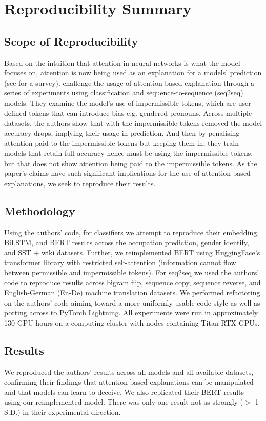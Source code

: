 \section*{\centering Reproducibility Summary}

\subsection*{Scope of Reproducibility}
Based on the intuition that attention in neural networks is what the model focuses on, attention is now being used as an explanation for a models' prediction (see \citet{galassi2020attention} for a survey). \citet{pruthi-etal-2020-learning} challenge the usage of attention-based explanation through a series of experiments using classification and sequence-to-sequence (seq2seq) models. They examine the model's use of impermissible tokens, which are user-defined tokens that can introduce bias e.g. gendered pronouns. Across multiple datasets, the authors show that with the impermissible tokens removed the model accuracy drops, implying their usage in prediction. And then by penalising attention paid to the impermissible tokens but keeping them in, they train models that retain full accuracy hence must be using the impermissible tokens, but that does not show attention being paid to the impermissible tokens. As the paper's claims have such significant implications for the use of attention-based explanations, we seek to reproduce their results.

\subsection*{Methodology}
Using the authors' code, for classifiers we attempt to reproduce their embedding, BiLSTM, and BERT results across the occupation prediction, gender identify, and SST + wiki datasets. Further, we reimplemented BERT using HuggingFace's transformer library \citep{huggingface} with restricted self-attention (information cannot flow between permissible and impermissible tokens). For seq2seq we used the authors' code to reproduce results across bigram flip, sequence copy, sequence reverse, and English-German (En-De) machine translation datasets. We performed refactoring on the authors' code aiming toward a more uniformly usable code style as well as porting across to PyTorch Lightning. All experiments were run in approximately 130 GPU hours on a computing cluster with nodes containing Titan RTX GPUs.

\subsection*{Results}
We reproduced the authors' results across all models and all available datasets, confirming their findings that attention-based explanations can be manipulated and that models can learn to deceive. We also replicated their BERT results using our reimplemented model. There was only one result not as strongly ($>$ 1 S.D.) in their experimental direction.

